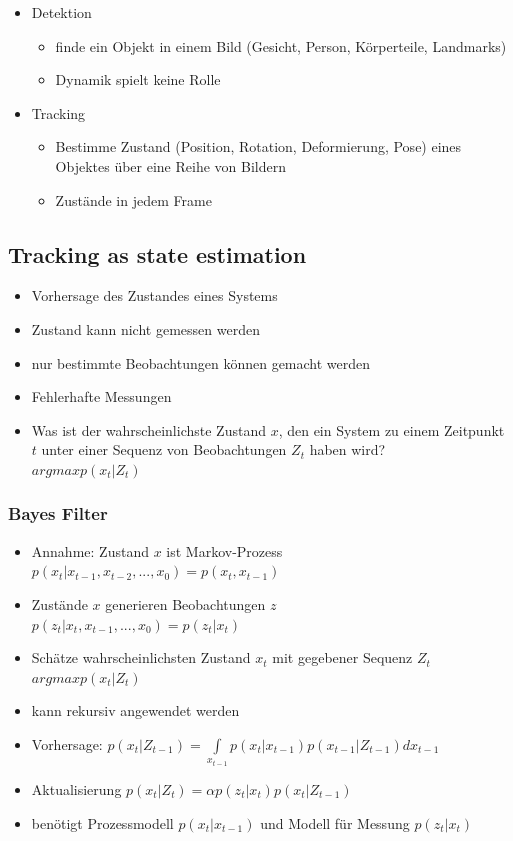 \documentclass[paper=a4, fontsize=11pt]{scrartcl} %
\numberwithin{equation}{section} %
\numberwithin{figure}{section} %
\numberwithin{table}{section} %
\begin{document}
\begin{itemize}
\item Detektion
\begin{itemize}
\item finde ein Objekt in einem Bild (Gesicht, Person, Körperteile, Landmarks)
\item Dynamik spielt keine Rolle
\end{itemize}
\item Tracking
\begin{itemize}
\item Bestimme Zustand (Position, Rotation, Deformierung, Pose) eines Objektes über eine Reihe von Bildern 
\item Zustände in jedem Frame
\end{itemize}
\end{itemize}


\subsection{Tracking as state estimation}

\begin{itemize}
\item Vorhersage des Zustandes eines Systems
\item Zustand kann nicht gemessen werden
\item nur bestimmte Beobachtungen können gemacht werden
\item Fehlerhafte Messungen
\item Was ist der wahrscheinlichste Zustand $x$, den ein System zu einem Zeitpunkt $t$ unter einer Sequenz von Beobachtungen $Z_t$ haben wird?\\ 
$argmax p(x_t|Z_t)$
\end{itemize}

\subsubsection{Bayes Filter}

\begin{itemize}
\item Annahme: Zustand $x$ ist Markov-Prozess\\ 
$p(x_t|x_{t-1},x_{t-2},...,x_0) = p(x_t,x_{t-1})$
\item Zustände $x$ generieren Beobachtungen $z$\\ 
$p(z_t|x_t,x_{t-1},...,x_0) = p(z_t|x_t)$
\item Schätze wahrscheinlichsten Zustand $x_t$ mit gegebener Sequenz $Z_t$\\ 
$argmax p(x_t|Z_t)$
\item kann rekursiv angewendet werden
\item Vorhersage: $p(x_t|Z_{t-1}) = \int\limits_{x_{t-1}} p(x_t|x_{t-1}) p(x_{t-1}|Z_{t-1}) dx_{t-1}$
\item Aktualisierung $p(x_t|Z_t) = \alpha p(z_t|x_t) p(x_t|Z_{t-1})$
\item benötigt Prozessmodell $p(x_t|x_{t-1})$ und Modell für Messung $p(z_t|x_t)$
\end{itemize}
\end{document}
